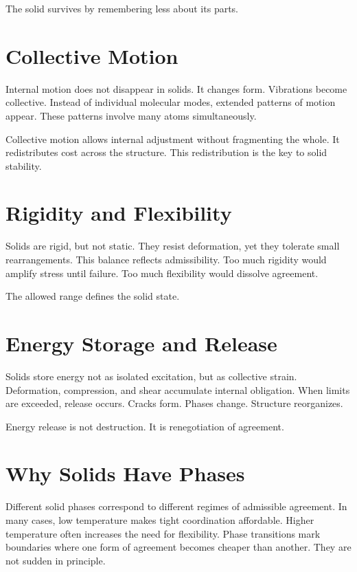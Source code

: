 \documentclass[11pt,twoside,openright]{book}
\begin{document}
The solid survives by remembering less about its parts.

\section*{Collective Motion}

Internal motion does not disappear in solids. It changes form. Vibrations become collective. Instead of individual molecular modes, extended patterns of motion appear. These patterns involve many atoms simultaneously.

Collective motion allows internal adjustment without fragmenting the whole. It redistributes cost across the structure. This redistribution is the key to solid stability.

\section*{Rigidity and Flexibility}

Solids are rigid, but not static. They resist deformation, yet they tolerate small rearrangements. This balance reflects admissibility. Too much rigidity would amplify stress until failure. Too much flexibility would dissolve agreement.

The allowed range defines the solid state.

\section*{Energy Storage and Release}

Solids store energy not as isolated excitation, but as collective strain. Deformation, compression, and shear accumulate internal obligation. When limits are exceeded, release occurs. Cracks form. Phases change. Structure reorganizes.

Energy release is not destruction. It is renegotiation of agreement.

\section*{Why Solids Have Phases}

Different solid phases correspond to different regimes of admissible agreement. In many cases, low temperature makes tight coordination affordable. Higher temperature often increases the need for flexibility. Phase transitions mark boundaries where one form of agreement becomes cheaper than another. They are not sudden in principle.
\end{document}
